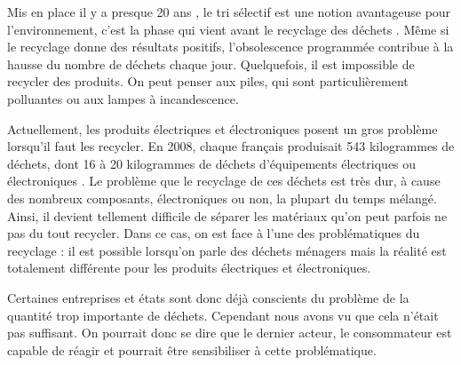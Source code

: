 \bigbreak
Mis en place il y a presque 20 ans , le tri sélectif est une notion avantageuse pour l’environnement, c'est la phase qui vient avant le recyclage des déchets \cite{tri}. Même si le recyclage donne des résultats positifs, l’obsolescence programmée contribue à la hausse du nombre de déchets chaque jour. Quelquefois, il est impossible de recycler des produits. On peut penser aux piles, qui sont particulièrement polluantes ou aux lampes à incandescence.

Actuellement, les produits électriques et électroniques posent un gros problème lorsqu'il faut les recycler. En 2008, chaque français produisait 543 kilogrammes de déchets, dont 16 à 20 kilogrammes de déchets d’équipements électriques ou électroniques \cite{opSsg}. Le problème que le recyclage de ces déchets est très dur, à cause des nombreux composants, électroniques ou non, la plupart du temps mélangé. Ainsi, il devient tellement difficile de séparer les matériaux qu'on peut parfois ne pas du tout recycler. Dans ce cas, on est face à l'une des problématiques du recyclage : il est possible lorsqu'on parle des déchets ménagers mais la réalité est totalement différente pour les produits électriques et électroniques. 


\bigbreak
Certaines entreprises et états sont donc déjà conscients du problème de la quantité trop importante de déchets. Cependant nous avons vu que cela n'était pas suffisant. On pourrait donc se dire que le dernier acteur, le consommateur est capable de réagir et pourrait être sensibiliser à cette problématique.